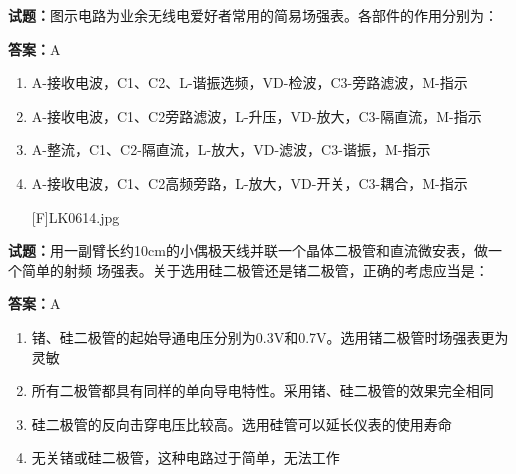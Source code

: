\documentclass{ctexbook}
\begin{document}




\vspace{1em}

\textbf{试题：}图示电路为业余无线电爱好者常用的简易场强表。各部件的作用分别为： 

\textbf{答案：}A 

\begin{enumerate}[leftmargin=3em]
  \item A-接收电波，C1、C2、L-谐振选频，VD-检波，C3-旁路滤波，M-指示 

  \item A-接收电波，C1、C2旁路滤波，L-升压，VD-放大，C3-隔直流，M-指示 

  \item A-整流，C1、C2-隔直流，L-放大，VD-滤波，C3-谐振，M-指示 

  \item A-接收电波，C1、C2高频旁路，L-放大，VD-开关，C3-耦合，M-指示 

[F]LK0614.jpg 

\end{enumerate}





\vspace{1em}

\textbf{试题：}用一副臂长约10cm的小偶极天线并联一个晶体二极管和直流微安表，做一个简单的射频
场强表。关于选用硅二极管还是锗二极管，正确的考虑应当是： 

\textbf{答案：}A 

\begin{enumerate}[leftmargin=3em]
  \item 锗、硅二极管的起始导通电压分别为0.3V和0.7V。选用锗二极管时场强表更为灵敏 

  \item 所有二极管都具有同样的单向导电特性。采用锗、硅二极管的效果完全相同 

  \item 硅二极管的反向击穿电压比较高。选用硅管可以延长仪表的使用寿命 

  \item 无关锗或硅二极管，这种电路过于简单，无法工作 

\end{enumerate}

\end{document}
